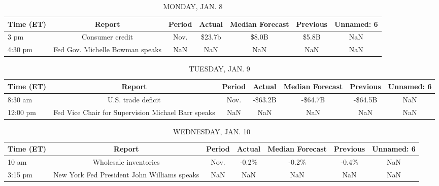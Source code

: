 \documentclass{article}%
\begin{document}
%
\normalsize%


\begin{table}[htbp]%
\caption{MONDAY, JAN. 8}%
\centering%
\begin{adjustbox}{width=1\textwidth}%
\begin{tabular}{lcccccc}
\toprule
Time (ET) &                          Report & Period & Actual & Median Forecast & Previous & Unnamed: 6 \\
\midrule
     3 pm &                 Consumer credit &   Nov. & \$23.7b &           \$8.0B &    \$5.8B &        NaN \\
  4:30 pm & Fed Gov. Michelle Bowman speaks &    NaN &    NaN &             NaN &      NaN &        NaN \\
\bottomrule
\end{tabular}
%
\end{adjustbox}%
\end{table}

%


\begin{table}[htbp]%
\caption{TUESDAY, JAN. 9}%
\centering%
\begin{adjustbox}{width=1\textwidth}%
\begin{tabular}{lcccccc}
\toprule
Time (ET) &                                             Report & Period &  Actual & Median Forecast & Previous & Unnamed: 6 \\
\midrule
  8:30 am &                                 U.S. trade deficit &   Nov. & -\$63.2B &         -\$64.7B &  -\$64.5B &        NaN \\
 12:00 pm & Fed Vice Chair for Supervision Michael Barr speaks &    NaN &     NaN &             NaN &      NaN &        NaN \\
\bottomrule
\end{tabular}
%
\end{adjustbox}%
\end{table}

%


\begin{table}[htbp]%
\caption{WEDNESDAY, JAN. 10}%
\centering%
\begin{adjustbox}{width=1\textwidth}%
\begin{tabular}{lcccccc}
\toprule
Time (ET) &                                      Report & Period & Actual & Median Forecast & Previous & Unnamed: 6 \\
\midrule
    10 am &                       Wholesale inventories &   Nov. &  -0.2\% &           -0.2\% &    -0.4\% &        NaN \\
  3:15 pm & New York Fed President John Williams speaks &    NaN &    NaN &             NaN &      NaN &        NaN \\
\bottomrule
\end{tabular}
%
\end{adjustbox}%
\end{table}
\end{document}
